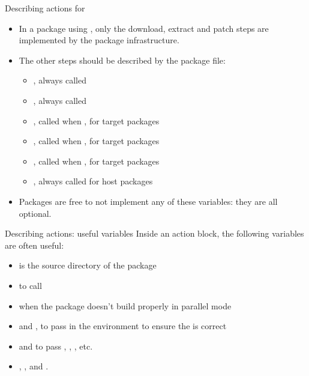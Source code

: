 \begin{frame}{Describing actions for }
  \begin{itemize}
  \item In a package using , only the download,
    extract and patch steps are implemented by the package
    infrastructure.
  \item The other steps should be described by the package 
    file:
    \begin{itemize}
    \item {}, always called
    \item {}, always called
    \item {}, called when
      , for target packages
    \item {}, called when
      , for target packages
    \item {}, called when
      , for target packages
    \item {}, always called for host packages
    \end{itemize}
  \item Packages are free to not implement any of these variables:
    they are all optional.
  \end{itemize}
\end{frame}

\begin{frame}{Describing actions: useful variables}
  Inside an action block, the following variables are often useful:
  \begin{itemize}
  \item {} is the source directory of the package
  \item {} to call 
  \item {} when the package doesn't build properly in
    parallel mode
  \item {} and , to pass
    in the  environment to ensure the  is
    correct
  \item {} and
     to pass , ,
    , etc.
  \item {}, ,
     and .
  \end{itemize}
\end{frame}

